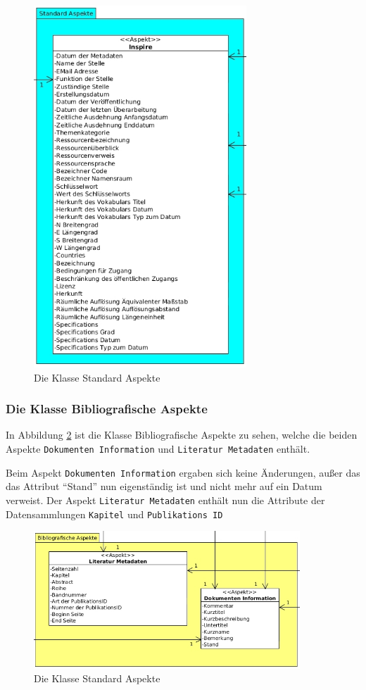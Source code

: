 \begin{figure}[!ht]
\centering
\includegraphics[width=8cm]{Bilder/AlfrescoModell/Standard-Aspekte.jpg}
\caption{Die Klasse Standard Aspekte}
\label{Klasse Standard Aspekte}
\centering
\end{figure}

\subsubsection{Die Klasse Bibliografische Aspekte} \label{Die Klasse Bibliografische Aspekte}
In Abbildung \ref{Klasse Bibligrafische Aspekte} ist die Klasse Bibliografische Aspekte zu sehen, welche die beiden Aspekte \texttt{Dokumenten Information} und \texttt{Literatur Metadaten} enth\"alt.

Beim Aspekt \texttt{Dokumenten Information} ergaben sich keine \"Anderungen, au\ss{}er das das Attribut "`Stand"' nun eigenst\"andig ist und nicht mehr auf ein Datum verweist. Der Aspekt \texttt{Literatur Metadaten} enth\"alt nun die Attribute der Datensammlungen \texttt{Kapitel} und \texttt{Publikations ID}

\begin{figure}[!ht]
\centering
\includegraphics[width=10cm]{Bilder/AlfrescoModell/Bibliografische-Aspekte.jpg}
\caption{Die Klasse Standard Aspekte}
\label{Klasse Bibligrafische Aspekte}
\centering
\end{figure}

